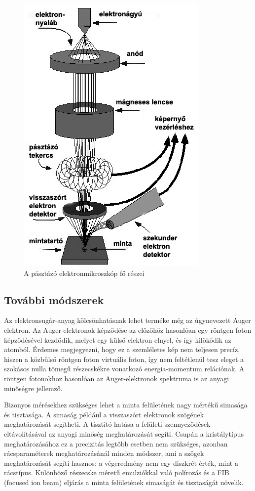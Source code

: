 \documentclass[pdftex,12pt,a4paper]{article}
\begin{document}
		\begin{figure}[H]
			\centering
			\includegraphics[scale=0.5]{./figs/image-001.png}
			\caption{A pásztázó elektronmikroszkóp fő részei}
		\end{figure}
	\subsection{További módszerek}
		Az elektronsugár-anyag kölcsönhatásnak lehet terméke még az úgynevezett Auger elektron. Az Auger-elektronok képződése az előzőhöz hasonlóan egy röntgen foton képződésével kezdődik, melyet egy külső elektron elnyel, és így kilökődik az atomból. Érdemes megjegyezni, hogy ez a szemléletes kép nem teljesen precíz, hiszen a közbülső röntgen foton virtuális foton, így nem feltétlenül tesz eleget a szokásos nulla tömegű részecskékre vonatkozó energia-momentum relációnak. A röntgen fotonokhoz hasonlóan az Auger-elektronok spektruma is az anyagi minőségre jellemző.
		
		Bizonyos mérésekhez szükséges lehet a minta felületének nagy mértékű simasága és tisztasága. A simaság például a visszaszórt elektronok szögének meghatározását segítheti. A tisztító hatása a felületi szennyeződések eltávolításával az anyagi minőség meghatározását segíti. Csupán a kristálytípus meghatározásához ez a precizitás legtöbb esetben nem szükséges, azonban rácsparaméterek meghatározásánál minden módszer, ami a szögek meghatározását segíti hasznos: a végeredmény nem egy diszkrét érték, mint a rácstípus. Különböző részecske méretű emulziókkal való polírozás és a FIB (focused ion beam) eljárás a minta felületének simaságát és tisztaságát növelik.
		
\end{document}
